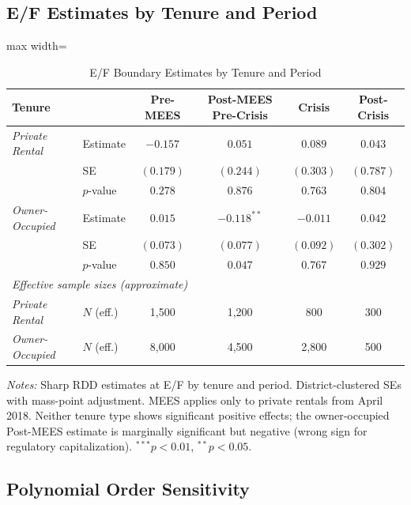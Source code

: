 \documentclass[12pt]{article}
\begin{document}
\subsection{E/F Estimates by Tenure and Period}

\begin{table}[H]
\centering
\caption{E/F Boundary Estimates by Tenure and Period}
\label{tab:tenure_ef}
\begin{adjustbox}{max width=\textwidth}
\begin{tabular}{llcccc}
\toprule
Tenure & & Pre-MEES & Post-MEES Pre-Crisis & Crisis & Post-Crisis \\
\midrule
\textit{Private Rental} & Estimate & $-0.157$ & $0.051$ & $0.089$ & $0.043$ \\
 & SE & $(0.179)$ & $(0.244)$ & $(0.303)$ & $(0.787)$ \\
 & $p$-value & $0.278$ & $0.876$ & $0.763$ & $0.804$ \\
\addlinespace
\textit{Owner-Occupied} & Estimate & $0.015$ & $-0.118^{**}$ & $-0.011$ & $0.042$ \\
 & SE & $(0.073)$ & $(0.077)$ & $(0.092)$ & $(0.302)$ \\
 & $p$-value & $0.850$ & $0.047$ & $0.767$ & $0.929$ \\
\midrule
\multicolumn{6}{l}{\textit{Effective sample sizes (approximate)}} \\
\textit{Private Rental} & $N$ (eff.) & 1,500 & 1,200 & 800 & 300 \\
\textit{Owner-Occupied} & $N$ (eff.) & 8,000 & 4,500 & 2,800 & 500 \\
\bottomrule
\end{tabular}
\end{adjustbox}
\begin{minipage}{\textwidth}
\footnotesize
\textit{Notes:} Sharp RDD estimates at E/F by tenure and period. District-clustered SEs with mass-point adjustment. MEES applies only to private rentals from April 2018. Neither tenure type shows significant positive effects; the owner-occupied Post-MEES estimate is marginally significant but negative (wrong sign for regulatory capitalization).
$^{***}p<0.01$, $^{**}p<0.05$.
\end{minipage}
\end{table}

\subsection{Polynomial Order Sensitivity}\label{app:polynomial}
\end{document}
